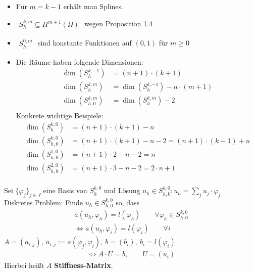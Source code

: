 \begin{bemerkung}\
\begin{itemize}
\item Für $m=k-1$ erhält man Splines.
\item $\begin{aligned}
S_h^{k,m}\subseteq H^{m+1}(\Omega)
\end{aligned}$ wegen Proposition 1.4 %
\item $\begin{aligned}
S_h^{0,m}
\end{aligned}$ sind konstante Funktionen auf $(0,1)$ für $m\geq0$
\item Die Räume haben folgende Dimensionen:
\begin{align*}
\dim\left(S_h^{k,-1}\right)&=(n+1)\cdot(k+1)\\
\dim\left(S_h^{k,m}\right)&=\dim\left(S_h^{k,-1}\right)-n\cdot(m+1)\\
\dim\left(S_{h,0}^{k,m}\right)&=\dim\left(S_h^{k,m}\right)-2\\
\end{align*}
Konkrete wichtige Beispiele:
\begin{align*}
\dim\left(S_h^{k,0}\right)&=(n+1)\cdot(k+1)-n\\
\dim\left(S_{h,0}^{k,0}\right)&=(n+1)\cdot(k+1)-n-2=(n+1)\cdot(k-1)+n\\
\dim\left(S_{h,0}^{1,0}\right)&=(n+1)\cdot 2-n-2=n\\
\dim\left(S_{h,0}^{2,0}\right)&=(n+1)\cdot 3-n-2=2\cdot n+1\\
\end{align*}
\end{itemize}
\end{bemerkung}
Sei $\lbrace\varphi_j\rbrace_{j\in J}$ eine Basis von $S_h^{k,0}$
und Lösung $u_h\in S_{h,0}^{k,0}: u_h=\sum\limits_j u_j\cdot\varphi_j$\\
Diskretes Problem: Finde $u_h\in S_{h,0}^{k,0}$ so, dass 
\begin{align*}
a(u_h,\varphi_h)=l(\varphi_h)\qquad\forall \varphi_h\in S_{h,0}^{k,0}\\
\Longleftrightarrow a(u_h,\varphi_i)=l(\varphi_i)\qquad\forall i
\end{align*}
$A=(a_{i,j}),~a_{i,j}:=a(\varphi_j,\varphi_i),~b=(b_i),~b_i=l(\varphi_i)$
\begin{align*}
\Longleftrightarrow A\cdot U=b,\qquad U=(u_i)
\end{align*}
Hierbei heißt $A$ \textbf{Stiffness-Matrix}.

